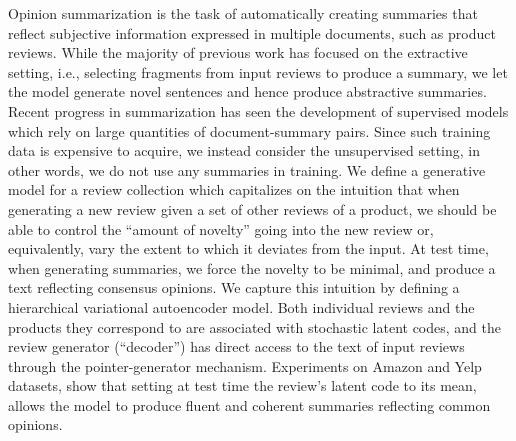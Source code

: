Opinion summarization is the task of automatically creating summaries that reflect subjective information expressed in multiple documents, such as product reviews. While the majority of previous work has focused on the extractive setting, i.e., selecting fragments from input reviews to produce a summary, we let the model generate novel sentences and hence produce abstractive summaries. Recent progress in summarization has seen the development of supervised models which rely on large quantities of document-summary pairs. Since such training data is expensive to acquire, we instead consider the unsupervised setting, in other words, we do not use any summaries in training. We define a generative model for a review collection which capitalizes on the intuition that when generating a new review given a set of other reviews of a product, we should be able to control the ``amount of novelty'' going into the new review or, equivalently, vary the extent to which it deviates from the input. At test time, when generating summaries, we force the novelty to be minimal, and produce a text reflecting consensus opinions. We capture this intuition by defining a hierarchical variational autoencoder model. Both individual reviews and the products they correspond to are associated with stochastic latent codes, and the review generator (``decoder'') has direct access to the text of input reviews through the pointer-generator mechanism. Experiments on Amazon and Yelp datasets, show that setting at test time the review's latent code to its mean, allows the model to produce fluent and coherent summaries reflecting common opinions.
